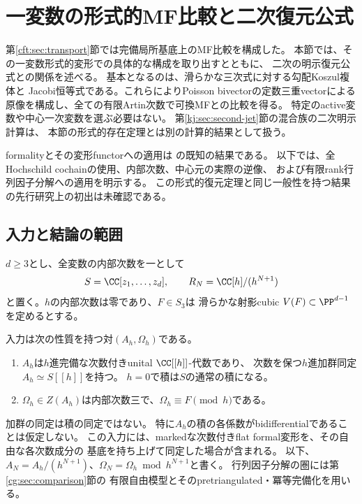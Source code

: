 \section{一変数の形式的MF比較と二次復元公式}
\label{fo:sec:formal-cubic}

第\ref{cft:sec:transport}節では完備局所基底上のMF比較を構成した。
本節では、その一変数形式的変形での具体的な構成を取り出すとともに、
二次の明示復元公式との関係を述べる。
基本となるのは、滑らかな三次式に対する勾配Koszul複体と
Jacobi恒等式である。これらによりPoisson bivectorの定数三重vectorによる
原像を構成し、全ての有限Artin次数で可換MFとの比較を得る。
特定のactive変数や中心一次変数を選ぶ必要はない。
第\ref{kj:sec:second-jet}節の混合族の二次明示計算は、
本節の形式的存在定理とは別の計算的結果として扱う。

formalityとその変形functorへの適用は
\cite[Sections~4.3--4.6, 6]{PKontsevich}の既知の結果である。
以下では、全Hochschild cochainの使用、内部次数、中心元の実際の逆像、
および有限rank行列因子分解への適用を明示する。
この形式的復元定理と同じ一般性を持つ結果の先行研究上の初出は未確認である。

\subsection{入力と結論の範囲}

$d\ge3$とし、全変数の内部次数を一として
\[
 S=\CC[z_1,\ldots,z_d],\qquad
 R_N=\CC[h]/(h^{N+1})
\]
と置く。$h$の内部次数は零であり、$F\in S_3$は
滑らかな射影cubic $V(F)\subset\PP^{d-1}$を定めるとする。

入力は次の性質を持つ対$(A_h,\Omega_h)$である。
\begin{enumerate}
 \item $A_h$は$h$進完備な次数付きunital $\CC[[h]]$-代数であり、
 次数を保つ$h$進加群同定$A_h\simeq S[[h]]$を持つ。
 $h=0$で積は$S$の通常の積になる。
 \item $\Omega_h\in Z(A_h)$は内部次数三で、$\Omega_h\equiv F\pmod h$である。
\end{enumerate}
加群の同定は積の同定ではない。
特に$A_h$の積の各係数がbidifferentialであることは仮定しない。
この入力には、markedな次数付きflat formal変形を、その自由な各次数成分の
基底を持ち上げて同定した場合が含まれる。
以下、$A_N=A_h/(h^{N+1})$、$\Omega_N=\Omega_h\bmod h^{N+1}$と書く。
行列因子分解の圏には第\ref{cg:sec:comparison}節の
有限自由模型とそのpretriangulated・冪等完備化を用いる。

